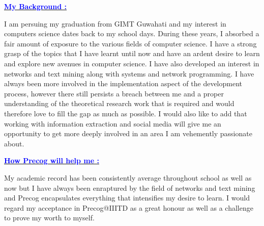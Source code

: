 \documentclass{article}
\newcommand{\statement}[1]{\par\medskip
  \underline{\textcolor{blue}{\textbf{#1}}}\space
}
\begin{document}
\statement{My Background :}
I am persuing my graduation from GIMT Guwahati and my interest in computers science dates back to my school days.
During these years, I absorbed a fair amount of exposure to the various fields of computer science. 
I have a strong grasp of the topics that I have learnt until now and have an ardent desire to learn and explore new avenues in computer science.
I have also developed an interest in networks and text mining along with systems and network programming.
I have always been more involved in the implementation aspect of the development process, however there still persists a breach between me and a proper understanding of the theoretical research work that is required and would therefore love to fill the gap as much as possible. I would also like to add that working with information extraction and social media will give me an opportunity to get more deeply involved in an area I am vehemently passionate about.

\statement{How Precog will help me :}
My academic record has been consistently average throughout school as well as now but I have always been enraptured by the field of networks and text mining and Precog encapsulates everything that intensifies my desire to learn.  
I would regard my acceptance in Precog@IIITD as a great honour as well as a challenge to prove my worth to myself.
\end{document}
